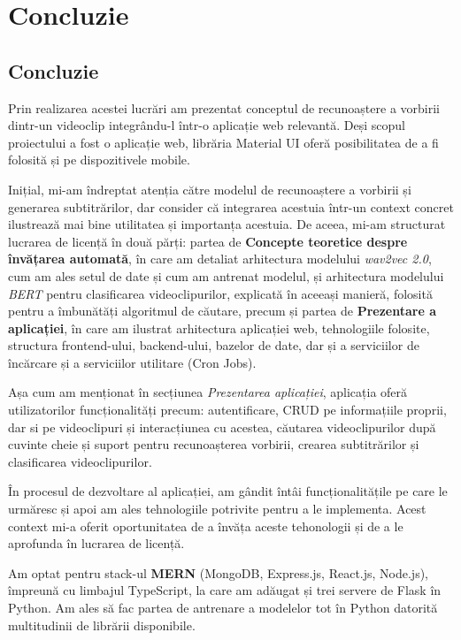 \chapter{Concluzie}

\section{Concluzie}
Prin realizarea acestei lucrări am prezentat conceptul de recunoaștere a vorbirii dintr-un videoclip 
integrându-l într-o aplicație web relevantă. Deși scopul proiectului a fost o aplicație web,
librăria Material UI oferă posibilitatea de a fi folosită și pe dispozitivele mobile.
\par
Inițial, mi-am îndreptat atenția către modelul de recunoaștere a vorbirii și generarea subtitrărilor,
dar consider că  integrarea acestuia într-un context concret ilustrează mai bine utilitatea și
importanța acestuia. De aceea, mi-am structurat lucrarea de licență în două părți: partea de
\textbf{Concepte teoretice despre învățarea automată}, în care am detaliat arhitectura modelului \textit{wav2vec 2.0},
cum am ales setul de date și cum am antrenat modelul, și arhitectura modelului \textit{BERT}
pentru clasificarea videoclipurilor, explicată în aceeași manieră, folosită pentru a îmbunătăți
algoritmul de căutare, precum și partea de \textbf{Prezentare a aplicației}, în care am ilustrat arhitectura
aplicației web, tehnologiile folosite, structura frontend-ului, backend-ului, bazelor de date,
dar și a serviciilor de încărcare și a serviciilor utilitare (Cron Jobs).
\par
Așa cum am menționat în secțiunea \textit{Prezentarea aplicației}, aplicația oferă utilizatorilor
funcționalități precum: autentificare, CRUD pe informațiile proprii, dar si pe videoclipuri și
interacțiunea cu acestea, căutarea videoclipurilor după cuvinte cheie și suport pentru recunoașterea
vorbirii, crearea subtitrărilor și clasificarea videoclipurilor.
\par
În procesul de dezvoltare al aplicației, am gândit întâi funcționalitățile pe care le urmăresc
și apoi am ales tehnologiile potrivite pentru a le implementa. Acest context mi-a oferit 
oportunitatea de a învăța aceste tehonologii și de a le aprofunda în lucrarea de licență.
\par
Am optat pentru stack-ul \textbf{MERN} (MongoDB, Express.js, React.js, Node.js), împreună cu 
limbajul TypeScript, la care am adăugat și trei servere de Flask în Python. Am ales să fac partea
de antrenare a modelelor tot în Python datorită multitudinii de librării disponibile.

